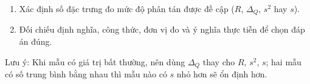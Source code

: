 \begin{enumerate}
\item Xác định số đặc trưng đo mức độ phân tán được đề cập ($R$, $\Delta_Q$, $s^2$ hay $s$).
\item Đối chiếu định nghĩa, công thức, đơn vị đo và ý nghĩa thực tiễn để chọn đáp án đúng.
\end{enumerate}
Lưu ý: Khi mẫu có giá trị bất thường, nên dùng $\Delta_Q$ thay cho $R$, $s^2$, $s$; hai mẫu có số trung bình bằng nhau thì mẫu nào có $s$ nhỏ hơn sẽ ổn định hơn.
